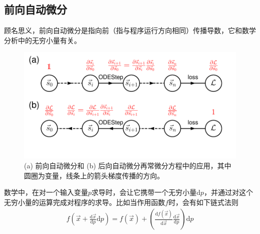 \documentclass[A4,twoside,fontset=ubuntu,UTF8]{ctexart}
\def\D{\mathrm{d}}
\begin{document}
\subsection{前向自动微分}
    顾名思义，前向自动微分是指向前（指与程序运行方向相同）传播导数，它和数学分析中的无穷小量有关。
    \begin{figure}[t]
        \centering
        \includegraphics[width=0.7\columnwidth,trim={0 0cm 0 0},clip]{fig3.pdf}

        \caption{(a) 前向自动微分和 (b) 后向自动微分再常微分方程中的应用，其中圆圈为变量，线条上的箭头梯度传播的方向。}\label{fig:autodifftypes} 
\end{figure}
数学中，在对一个输入变量$p$求导时，会让它携带一个无穷小量$\D p$，并通过对这个无穷小量的运算完成对程序的求导。比如当作用函数$f$时，会有如下链式法则
\begin{align}
    f(\vec x+ \frac{\D \vec x}{\D p} \D p) = f(\vec x) + \left(\frac{\D f(\vec x)}{\D \vec x}\frac{\D \vec x}{\D p}\right) \D p
\end{align}
\end{document}
